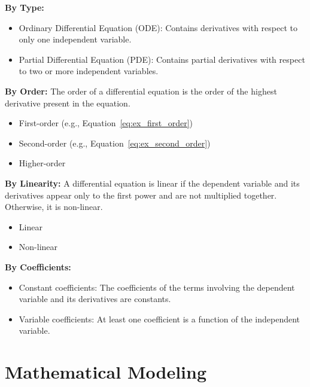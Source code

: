 \documentclass[12pt, letterpaper]{book}
\begin{document}
\textbf{By Type:}
\begin{itemize}
    \item Ordinary Differential Equation (ODE): Contains derivatives with respect to only one independent variable.
    \item Partial Differential Equation (PDE): Contains partial derivatives with respect to two or more independent variables.
\end{itemize}

\textbf{By Order:}
The order of a differential equation is the order of the highest derivative present in the equation.
\begin{itemize}
    \item First-order (e.g., Equation~\ref{eq:ex_first_order})
    \item Second-order (e.g., Equation~\ref{eq:ex_second_order})
    \item Higher-order
\end{itemize}

\textbf{By Linearity:}
A differential equation is linear if the dependent variable and its derivatives appear only to the first power and are not multiplied together. Otherwise, it is non-linear.
\begin{itemize}
    \item Linear
    \item Non-linear
\end{itemize}

\textbf{By Coefficients:}
\begin{itemize}
    \item Constant coefficients: The coefficients of the terms involving the dependent variable and its derivatives are constants.
    \item Variable coefficients: At least one coefficient is a function of the independent variable.
\end{itemize}

\section{Mathematical Modeling}
\label{sec:math_modeling}
\end{document}
